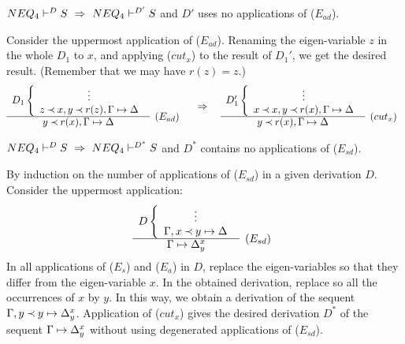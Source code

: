 \begin{LEMMA}\label{le:noEad}
 ${NEQ_4}\vdash^{{D}}S\ \mathrel\Rightarrow\ {NEQ_4}\vdash^{{D'}}S$ and $D'$ uses no applications of ($E_{ad}$).
\end{LEMMA}
\begin{PROOF}
Consider the uppermost application of ($E_{ad}$).
Renaming the eigen-variable $z$ in the whole $D_1$ to $x$, and applying ($cut_x$)
to the result of $D_1'$, we get the desired result. (Remember that we may have $r(z)=z$.)
\[ \begin{array}{cl}
D_1 \left \{ \begin{array}{c}
 \vdots \\
 z\Incl x, y\Incl r(z), \Gamma\Seq\Delta \end{array} \right . \\ \cline{1-1}
 y \Incl r(x), \Gamma\Seq\Delta & \raisebox{1.2ex}[1.5ex][0ex]{$(E_{ad})$}
\end{array} 
\conv
\begin{array}{cl}
D_1' \left \{ \begin{array}{c}
 \vdots \\
 x\Incl x, y\Incl r(x), \Gamma\Seq\Delta \end{array} \right . \\ \cline{1-1}
 y \Incl r(x), \Gamma\Seq\Delta & \raisebox{1.2ex}[1.5ex][0ex]{$(cut_x)$}
\end{array} \]
\end{PROOF}
%
\begin{LEMMA}\label{le:noEsd} 
${NEQ_4}\vdash^{{D}}S\ \mathrel\Rightarrow\ {NEQ_4}\vdash^{{D^*}}S$
and $D^*$ contains no applications of ($E_{sd}$).
\end{LEMMA}
\begin{PROOF}
By induction on the number of applications of ($E_{sd}$) in a given
derivation $D$. Consider the uppermost application:
\[ \begin{array}{cl}
D\left\{ \begin{array}{c}
 \vdots \\
 \Gamma,x\Incl y\Seq\Delta \end{array} \right. \\ \cline{1-1}
 \Gamma\Seq\Delta_y^x  &  \raisebox{1.2ex}[1.5ex][0ex]{($E_{sd}$)}
\end{array} \]
In all applications of ($E_s$) and ($E_a$) in $D$, replace the
eigen-variables so that they differ from the eigen-variable $x$. In the obtained
derivation, replace so all the occurrences of $x$ by $y$. In this way, we 
obtain a derivation of the sequent $\Gamma,y\mathbin{\prec} y\mathrel{\mapsto}\Delta_y^x$. 
Application of ($cut_x$) gives the desired derivation $D^*$ of the
sequent $\Gamma\mathrel{\mapsto}\Delta_y^x$ 
without using degenerated applications of ($E_{sd}$).
\end{PROOF}
